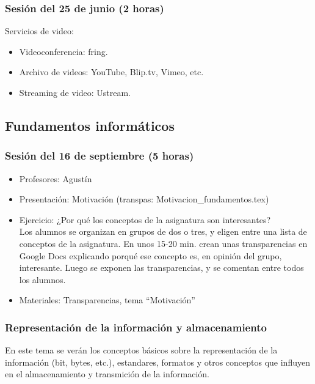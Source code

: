 \documentclass[a4paper,12pt]{article}
\begin{document}
\subsubsection{Sesión del 25 de junio (2 horas)}

Servicios de video:

\begin{itemize}
\item Videoconferencia: fring.
\item Archivo de videos: YouTube, Blip.tv, Vimeo, etc.
\item Streaming de video: Ustream.
\end{itemize}

\subsection{Fundamentos informáticos}

\subsubsection{Sesión del 16 de septiembre (5 horas)}

\begin{itemize}
\item Profesores: Agustín
\item Presentación: Motivación (transpas: Motivacion\_fundamentos.tex)
\item Ejercicio: ¿Por qué los conceptos de la asignatura son interesantes? \\
  Los alumnos se organizan en grupos de dos o tres, y eligen entre una lista de conceptos de la asignatura. En unos 15-20 min. crean unas transparencias en Google Docs explicando porqué ese concepto es, en opinión del grupo, interesante. Luego se exponen las transparencias, y se comentan entre todos los alumnos.
\item Materiales: Transparencias, tema ``Motivación''
\end{itemize}

\subsubsection{Representación de la información y almacenamiento}

En este tema se verán los conceptos básicos sobre la representación de la información (bit, bytes, etc.), estandares, formatos y otros conceptos que influyen en el almacenamiento y transmición de la información.
\end{document}
